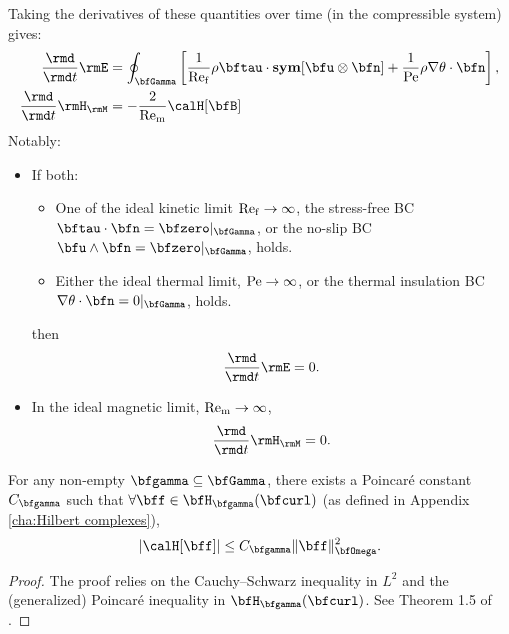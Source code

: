     Taking the derivatives of these quantities over time (in the compressible system) gives:
    \begin{align}
        \frac{\rmd}{\rmd t}\rmE         &=  \oint_{\bfGamma}\left[\frac{1}{\rmRef}\rho\bftau\cdot\sym[\bfu\otimes\bfn] + \frac{1}{\rmPe}\rho\nabla\theta\cdot\bfn\right],  \\
        \frac{\rmd}{\rmd t}\rmH_{\rmM}  &=  - \frac{2}{\rmRem}\calH[\bfB]
    \end{align}
    Notably:
    \begin{itemize}
        \item  If both:
        \begin{itemize}
            \item  One of the ideal kinetic limit $\mathrm{Re}_{\mathrm{f}}  \rightarrow  \infty$, the stress-free BC $\bftau\cdot\bfn  =  \bfzero|_{\bfGamma}$, or the no-slip BC $\bfu\wedge\bfn  =  \bfzero|_{\bfGamma}$, holds.
            \item  Either the ideal thermal limit, $\mathrm{Pe}  \rightarrow  \infty$, or the thermal insulation BC $\nabla\theta\cdot\bfn  =  0|_{\bfGamma}$, holds.
        \end{itemize}
        then
        \begin{equation}
            \frac{\rmd}{\rmd t}\rmE  =  0.
        \end{equation}

        \item  In the ideal magnetic limit, $\mathrm{Re}_{\mathrm{m}}  \rightarrow  \infty$,
        \begin{equation}
            \frac{\rmd}{\rmd t}\rmH_{\rmM}  =  0.
        \end{equation}
      \end{itemize}

    \line

    \begin{lemma}\label{lem:continuity of helicity}
        For any non-empty $\bfgamma  \subseteq  \bfGamma$, there exists a Poincaré constant $C_{\bfgamma}$ such that $\forall  \bff  \in  \bfH_{\bfgamma}(\bfcurl)$ (as defined in Appendix \ref{cha:Hilbert complexes}),
        \begin{equation}
            |\calH[\bff]|  \leq  C_{\bfgamma}\|\bff\|_{\bfOmega}^{2}.
        \end{equation}
    \end{lemma}
    \begin{proof}
        The proof relies on the Cauchy--Schwarz inequality in $L^{2}$ and the (generalized) Poincaré inequality in $\bfH_{\bfgamma}(\bfcurl)$. See Theorem 1.5 of \cite{Arnold_Khesin_2008}.
    \end{proof}


